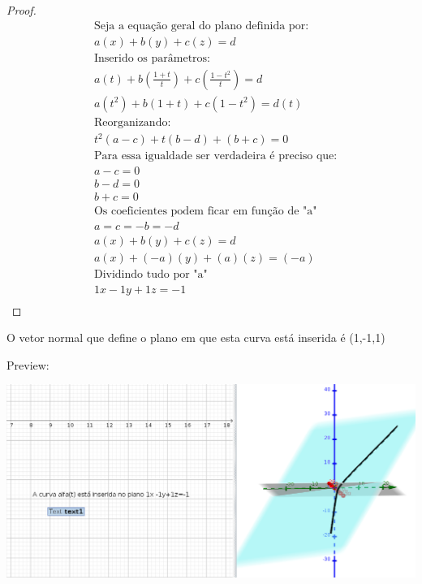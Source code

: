 \documentclass[fleqn]{article}
\begin{document}
\begin{proof}
\begin{align*}
 & \text{Seja a equação geral do plano definida por:} \\
 & a(x) + b(y) + c(z) = d \\
 & \text{Inserido os parâmetros:} \\
 & a(t) + b(\frac{1+t}{t}) + c(\frac{1-t^2}{t}) = d \\    
 & a(t^2) + b(1+t) + c(1-t^2) = d(t) \\
 & \text{Reorganizando:} \\
 & t^2(a-c)+t(b-d)+(b+c)=0 \\
 & \text{Para essa igualdade ser verdadeira é preciso que:}  \\
 & a - c = 0 \\
 & b - d = 0 \\
 & b + c = 0 \\
 & \text{Os coeficientes podem ficar em função de "a"}\\
 & a = c = - b = - d \\
 & a(x) + b(y) + c(z) = d \\
 & a(x) + (-a)(y) + (a)(z) = (-a)\\
 & \text{Dividindo tudo por "a"}\\
 & 1x -1y +1z = -1\\
\end{align*}
\end{proof}

\bigskip

O vetor normal que define o plano em que esta curva está inserida é (1,-1,1)
  
\newpage

Preview:

\bigskip


\includegraphics[scale=0.2]{curva-no-plano}

\bigskip
\end{document}
